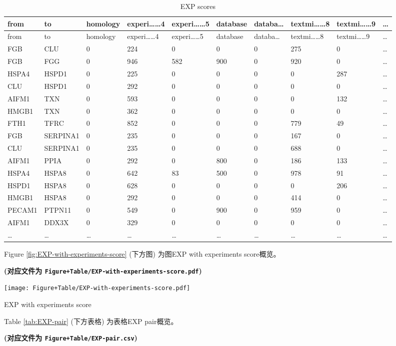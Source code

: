 \documentclass[
]{article}
\begin{document}
\begin{longtable}[]{@{}llllllllll@{}}
\caption{\label{tab:EXP-scores}EXP scores}\tabularnewline
\toprule
from & to & homology & experi\ldots\ldots4 & experi\ldots\ldots5 & database & databa\ldots{} & textmi\ldots\ldots8 & textmi\ldots\ldots9 & \ldots{}\tabularnewline
\midrule
\endfirsthead
\toprule
from & to & homology & experi\ldots\ldots4 & experi\ldots\ldots5 & database & databa\ldots{} & textmi\ldots\ldots8 & textmi\ldots\ldots9 & \ldots{}\tabularnewline
\midrule
\endhead
FGB & CLU & 0 & 224 & 0 & 0 & 0 & 275 & 0 & \ldots{}\tabularnewline
FGB & FGG & 0 & 946 & 582 & 900 & 0 & 920 & 0 & \ldots{}\tabularnewline
HSPA4 & HSPD1 & 0 & 225 & 0 & 0 & 0 & 0 & 287 & \ldots{}\tabularnewline
CLU & HSPD1 & 0 & 292 & 0 & 0 & 0 & 0 & 0 & \ldots{}\tabularnewline
AIFM1 & TXN & 0 & 593 & 0 & 0 & 0 & 0 & 132 & \ldots{}\tabularnewline
HMGB1 & TXN & 0 & 362 & 0 & 0 & 0 & 0 & 0 & \ldots{}\tabularnewline
FTH1 & TFRC & 0 & 852 & 0 & 0 & 0 & 779 & 49 & \ldots{}\tabularnewline
FGB & SERPINA1 & 0 & 235 & 0 & 0 & 0 & 167 & 0 & \ldots{}\tabularnewline
CLU & SERPINA1 & 0 & 235 & 0 & 0 & 0 & 688 & 0 & \ldots{}\tabularnewline
AIFM1 & PPIA & 0 & 292 & 0 & 800 & 0 & 186 & 133 & \ldots{}\tabularnewline
HSPA4 & HSPA8 & 0 & 642 & 83 & 500 & 0 & 978 & 91 & \ldots{}\tabularnewline
HSPD1 & HSPA8 & 0 & 628 & 0 & 0 & 0 & 0 & 206 & \ldots{}\tabularnewline
HMGB1 & HSPA8 & 0 & 292 & 0 & 0 & 0 & 414 & 0 & \ldots{}\tabularnewline
PECAM1 & PTPN11 & 0 & 549 & 0 & 900 & 0 & 959 & 0 & \ldots{}\tabularnewline
AIFM1 & DDX3X & 0 & 329 & 0 & 0 & 0 & 0 & 0 & \ldots{}\tabularnewline
\ldots{} & \ldots{} & \ldots{} & \ldots{} & \ldots{} & \ldots{} & \ldots{} & \ldots{} & \ldots{} & \ldots{}\tabularnewline
\bottomrule
\end{longtable}

Figure \ref{fig:EXP-with-experiments-score} (下方图) 为图EXP with experiments score概览。

\textbf{(对应文件为 \texttt{Figure+Table/EXP-with-experiments-score.pdf})}

\def\@captype{figure}
\begin{center}
\texttt{[image: Figure+Table/EXP-with-experiments-score.pdf]}
\caption{EXP with experiments score}\label{fig:EXP-with-experiments-score}
\end{center}

Table \ref{tab:EXP-pair} (下方表格) 为表格EXP pair概览。

\textbf{(对应文件为 \texttt{Figure+Table/EXP-pair.csv})}
\end{document}
